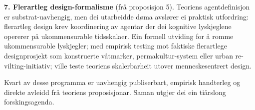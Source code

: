 \textbf{7. Flerartleg design-formalisme} (frå proposisjon 5). Teoriens agentdefinisjon er substrat-uavhengig, men dei utarbeidde døma avslører ei praktisk utfordring: flerartleg design krev koordinering av agentar der dei kognitive lyskjeglene opererer på ukommensurable tidsskalaer. Ein formell utviding for å romme ukommensurable lyskjegler; med empirisk testing mot faktiske flerartlege designprosjekt som konstruerte våtmarker, permakultur-system eller urban re-vilting-initiativ; ville teste teoriens skalerbarheit utover menneskesentrert design.

Kvart av desse programma er uavhengig publiserbart, empirisk handterleg og direkte avleidd frå teoriens proposisjonar. Saman utgjer dei ein tiårslong forskingsagenda.
